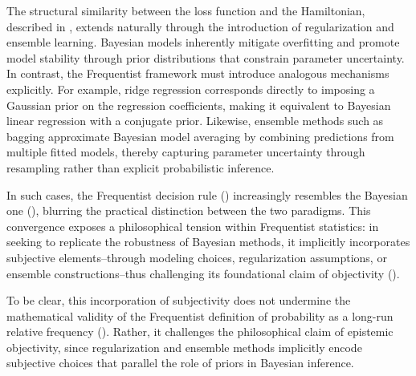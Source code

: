 \begin{remark}
	\label{rm:philosophical_challenge}
	The structural similarity between the loss function and the Hamiltonian, described in , extends naturally through the introduction of regularization and ensemble learning. Bayesian models inherently mitigate overfitting and promote model stability through prior distributions that constrain parameter uncertainty. In contrast, the Frequentist framework must introduce analogous mechanisms explicitly. For example, ridge regression\citep{Plaut1986} corresponds directly to imposing a Gaussian prior on the regression coefficients, making it equivalent to Bayesian linear regression with a conjugate prior. Likewise, ensemble methods such as bagging approximate Bayesian model averaging by combining predictions from multiple fitted models, thereby capturing parameter uncertainty through resampling rather than explicit probabilistic inference.
	
	In such cases, the Frequentist decision rule () increasingly resembles the Bayesian one (), blurring the practical distinction between the two paradigms. This convergence exposes a philosophical tension within Frequentist statistics: in seeking to replicate the robustness of Bayesian methods, it implicitly incorporates subjective elements--through modeling choices, regularization assumptions, or ensemble constructions--thus challenging its foundational claim of objectivity (). 
	
	To be clear, this incorporation of subjectivity does not undermine the mathematical validity of the Frequentist definition of probability as a long-run relative frequency (). Rather, it challenges the philosophical claim of epistemic objectivity, since regularization and ensemble methods implicitly encode subjective choices that parallel the role of priors in Bayesian inference.
\end{remark}


